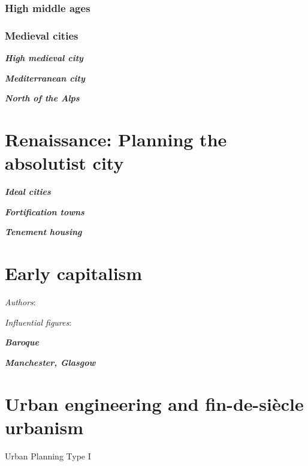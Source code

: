 \documentclass{article}
\newcommand{\bisection}[1]{\textbf{\textit{#1}}}
\begin{document}
\subsubsection{High middle ages}

\subsubsection{Medieval cities}

\bisection{High medieval city}

\bisection{Mediterranean city}

\bisection{North of the Alps}

\pagebreak
\section{Renaissance: Planning the absolutist city}

\bisection{Ideal cities}

\bisection{Fortification towns}

\bisection{Tenement housing}


\bisection{}

\bisection{}

\bisection{}

\bisection{}

\bisection{}

\bisection{}

\bisection{}

\bisection{}

\bisection{}

\bisection{}

\bisection{}

\pagebreak
\section{Early capitalism}

\textit{Authors}:

\textit{Influential figures}:

\bisection{Baroque}

\bisection{Manchester, Glasgow}

\pagebreak
\section{Urban engineering and fin-de-siècle urbanism}
Urban Planning Type I
\end{document}

